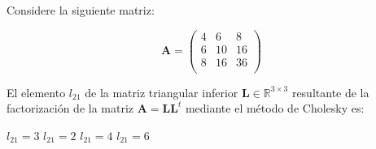 \begin{pregunta}
\begin{cuerpo}
Considere la siguiente matriz:

$$\boldsymbol{A}=\left(
\begin{array}{rrr}
4&6&8\\
6&10&16\\
8&16&36\\
\end{array}
\right)
$$

El elemento $l_{21}$ de la matriz triangular inferior $\boldsymbol{L}\in\mathbb{R}^{3\times3}$ resultante de la factorizaci\'on de la matriz $\boldsymbol{A}=\boldsymbol{LL}^t$ mediante el m\'etodo de Cholesky es:
\end{cuerpo}
\begin{multicols}{4}
\begin{alternativas}
{$l_{21}=3$}
{$l_{21}=2$}
{$l_{21}=4$}
{$l_{21}=6$}
\end{alternativas}
\end{multicols}
\justificacion{7cm}
\end{pregunta}